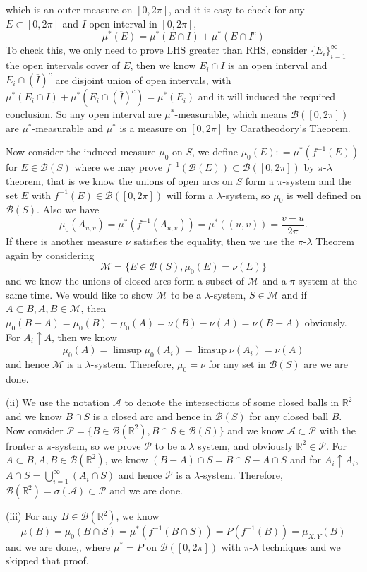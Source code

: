 \documentclass[lang=en,11pt,a4paper,citestyle =authoryear]{elegantpaper}
\newcommand{\R}{\mathbb{R}}
\newcommand{\B}{\mathcal{B}}
\begin{document}
which is an outer measure on $[0,2\pi]$, and it is easy to check for any $E\subset [0,2\pi]$ and $I$ open interval in $[0,2\pi]$,
\[
\mu^*(E) = \mu^*(E\cap I) + \mu^*(E\cap I^c)
\]
To check this, we only need to prove LHS greater than RHS, consider $\{E_i\}_{i=1}^{\infty}$ the open intervals cover of $E$, then we know $E_i \cap I$ is an open interval and $E_i \cap (\overline{I})^c$ are disjoint union of open intervals, with $\mu^*(E_i \cap I) + \mu^*(E_i \cap (\overline{I})^c) = \mu^*(E_i)$ and it will induced the required conclusion. So any open interval are $\mu^*$-measurable, which means $\B([0,2\pi])$ are $\mu^*$-measurable and $\mu^*$ is a measure on $[0,2\pi]$ by Caratheodory's Theorem.\par
Now consider the induced measure $\mu_0$ on $S$, we define $\mu_0(E): = \mu^*(f^{-1}(E))$ for $E\in \B(S)$ where we may prove $f^{-1}(\B(E)) \subset \B([0,2\pi])$ by $\pi$-$\lambda$ theorem, that is we know the unions of open arcs on $S$ form a $\pi$-system and the set $E$ with $f^{-1}(E) \in \B([0,2\pi])$ will form a $\lambda$-system, so $\mu_0$ is well defined on $\B(S)$. Also we have
\[
\mu_0(A_{u,v}) = \mu^*(f^{-1}(A_{u,v})) = \mu^*((u,v)) = \dfrac{v-u}{2\pi}.
\]
If there is another measure $\nu$ satisfies the equality, then we use the $\pi$-$\lambda$ Theorem again by considering
\[\mathcal{M} = \{E\in\B(S), \mu_0(E) = \nu(E)\}\]
and we know the unions of closed arcs form a subset of $\mathcal{M}$ and a $\pi$-system at the same time. We would like to show $\mathcal{M}$ to be a $\lambda$-system, $S\in \mathcal{M}$ and if $A\subset B, A,B\in\mathcal{M}$, then $\mu_0(B-A) = \mu_0(B)- \mu_0(A) = \nu(B)-\nu(A) = \nu(B-A)$ obviously. For $A_i \uparrow A$, then we know
\[\mu_0(A) = \limsup \mu_0(A_i) = \limsup \nu(A_i) = \nu(A)\]
and hence $\mathcal{M}$ is a $\lambda$-system. Therefore, $\mu_0 = \nu$ for any set in $\B(S)$ are we are done.\par
(ii) We use the notation $\mathcal{A}$ to denote the intersections of some closed balls in $\R^2$ and we know $B\cap S$ is a closed arc and hence in $\B(S)$ for any closed ball $B$. Now consider $\mathcal{P} = \{B\in\B(\R^2), B\cap S \in\B(S)\}$ and we know $\mathcal{A}\subset\mathcal{P}$ with the fronter a $\pi$-system, so we prove $\mathcal{P}$ to be a $\lambda$ system, and obviously $\R^2 \in \mathcal{P}$. For $A\subset B, A,B\in\B(\R^2)$, we know $(B-A)\cap S = B\cap S-A\cap S$ and for $A_i \uparrow A_i$, $A\cap S = \bigcup_{i=1}^{\infty} (A_i \cap S)$ and hence $\mathcal{P}$ is a $\lambda$-system. Therefore, $\B(\R^2) = \sigma(\mathcal{A}) \subset \mathcal{P}$ and we are done.\par
(iii) For any $B\in\B(\R^2)$, we know
\[
\mu(B) = \mu_0(B\cap S) = \mu^*(f^{-1}(B\cap S)) = P(f^{-1}(B)) = \mu_{X,Y}(B)
\]
and we are done,, where $\mu^* = P$ on $\B([0,2\pi])$ with $\pi$-$\lambda$ techniques and we skipped that proof.
\vspace{0.5em}
\end{document}
